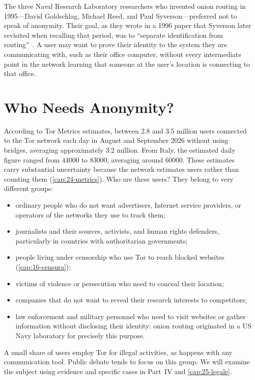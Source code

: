 \begin{storia}
The three Naval Research Laboratory researchers who invented onion routing in 1995---David Goldschlag, Michael Reed, and Paul Syverson---preferred not to speak of anonymity. Their goal, as they wrote in a 1996 paper that Syverson later revisited when recalling that period, was to \enquote{separate identification from routing}~\cite{syverson2011peel}. A user may want to prove their identity to the system they are communicating with, such as their office computer, without every intermediate point in the network learning that someone at the user's location is connecting to that office.
\end{storia}

\section{Who Needs Anonymity?}\label{sec:anon-utenti}

According to Tor Metrics estimates, between 2.8 and 3.5 million users connected to the Tor network each day in August and September 2026 without using bridges, averaging approximately 3.2 million. From Italy, the estimated daily figure ranged from \num{44000} to \num{83000}, averaging around \num{60000}. These estimates carry substantial uncertainty because the network estimates users rather than counting them (\cref{cap:24-metrics}). Who are these users? They belong to very different groups:
\begin{itemize}
  \item ordinary people who do not want advertisers, Internet service providers, or operators of the networks they use to track them;
  \item journalists and their sources, activists, and human rights defenders, particularly in countries with authoritarian governments;
  \item people living under censorship who use Tor to reach blocked websites (\cref{cap:16-censura});
  \item victims of violence or persecution who need to conceal their location;
  \item companies that do not want to reveal their research interests to competitors;
  \item law enforcement and military personnel who need to visit websites or gather information without disclosing their identity: onion routing originated in a US Navy laboratory for precisely this purpose.
\end{itemize}
A small share of users employ Tor for illegal activities, as happens with any communication tool. Public debate tends to focus on this group. We will examine the subject using evidence and specific cases in Part~IV and \cref{cap:25-legale}.


